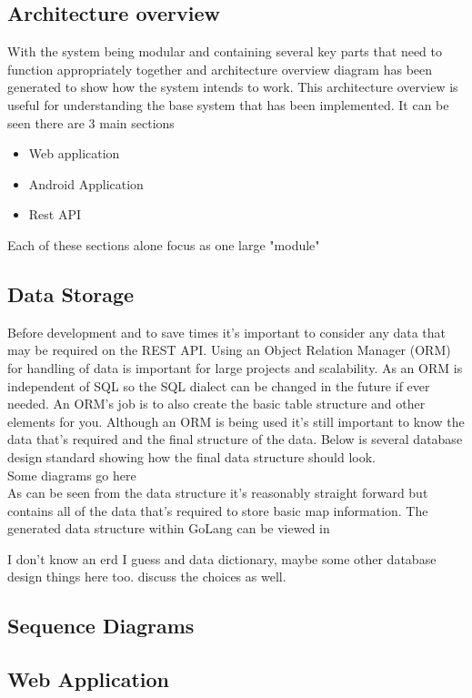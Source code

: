 \subsection{Architecture overview}
With the system being modular and containing several key parts that need to function appropriately together and architecture overview diagram has been generated to show how the system intends to work. This architecture overview is useful for understanding the base system that has been implemented. It can be seen there are 3 main sections

\begin{itemize}
	\item Web application
	\item Android Application
	\item Rest API
\end{itemize}

Each of these sections alone focus as one large "module" 

\subsection{Data Storage}
Before development and to save times it's important to consider any data that may be required on the REST API. Using an Object Relation Manager (ORM) for handling of data is important for large projects and scalability. As an ORM is independent of SQL so the SQL dialect can be changed in the future if ever needed. An ORM's job is to also create the basic table structure and other elements for you. Although an ORM is being used it's still important to know the data that's required and the final structure of the data. Below is several database design standard showing how the final data structure should look.
\\
Some diagrams go here
\\
As can be seen from the data structure it's reasonably straight forward but contains all of the data that's required to store basic map information. The generated data structure within GoLang can be viewed in \appendixtemp

I don't know an erd I guess and data dictionary, maybe some other database design things here too. discuss the choices as well.

\subsection{Sequence Diagrams}
\subsection{Web Application}

